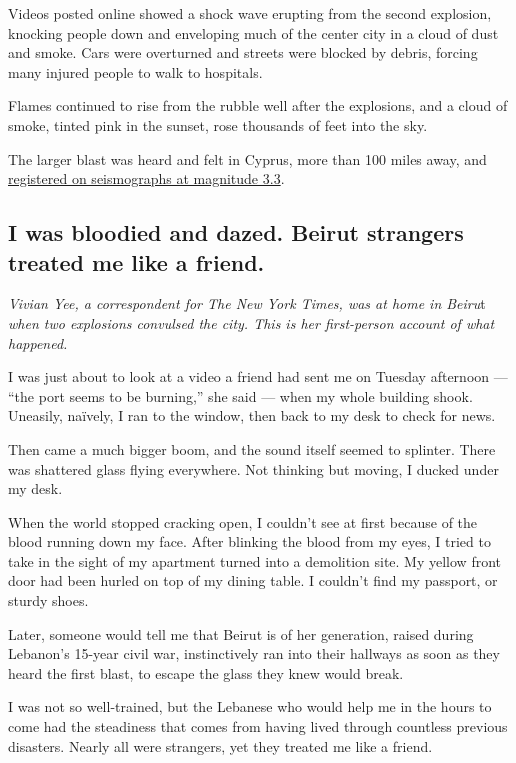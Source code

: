 Videos posted online showed a shock wave erupting from the second
explosion, knocking people down and enveloping much of the center city
in a cloud of dust and smoke. Cars were overturned and streets were
blocked by debris, forcing many injured people to walk to hospitals.

Flames continued to rise from the rubble well after the explosions, and
a cloud of smoke, tinted pink in the sunset, rose thousands of feet into
the sky.

The larger blast was heard and felt in Cyprus, more than 100 miles away,
and
\href{https://www.emsc-csem.org/Earthquake/earthquake.php?id=882410\#summary}{registered
on seismographs at magnitude 3.3}.

\hypertarget{i-was-bloodied-and-dazed-beirut-strangers-treated-me-like-a-friend}{%
\subsection{I was bloodied and dazed. Beirut strangers treated me like a
friend.}\label{i-was-bloodied-and-dazed-beirut-strangers-treated-me-like-a-friend}}

\emph{Vivian Yee, a correspondent for The New York Times, was at home in
Beiru}t \emph{when two explosions convulsed the city. This is her
first-person account of what happened.}

I was just about to look at a video a friend had sent me on Tuesday
afternoon --- ``the port seems to be burning,'' she said --- when my
whole building shook. Uneasily, naïvely, I ran to the window, then back
to my desk to check for news.

Then came a much bigger boom, and the sound itself seemed to splinter.
There was shattered glass flying everywhere. Not thinking but moving, I
ducked under my desk.

When the world stopped cracking open, I couldn't see at first because of
the blood running down my face. After blinking the blood from my eyes, I
tried to take in the sight of my apartment turned into a demolition
site. My yellow front door had been hurled on top of my dining table. I
couldn't find my passport, or sturdy shoes.

Later, someone would tell me that Beirut is of her generation, raised
during Lebanon's 15-year civil war, instinctively ran into their
hallways as soon as they heard the first blast, to escape the glass they
knew would break.

I was not so well-trained, but the Lebanese who would help me in the
hours to come had the steadiness that comes from having lived through
countless previous disasters. Nearly all were strangers, yet they
treated me like a friend.

